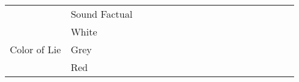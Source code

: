\begin{table*}[!h]
{\begin{tabular}{l|l|l|l|l|l|l|l|l|l|l|l|l|l|l|l|l|l}
                                                        & Sound Factual           & \multicolumn{1}{l|}{} & \multicolumn{1}{l|}{}                  & \multicolumn{1}{l|}{} & \multicolumn{1}{l|}{}                  & \multicolumn{1}{l|}{} & \multicolumn{1}{l|}{}                  & \multicolumn{1}{l|}{} &                   & \multicolumn{1}{l|}{} & \multicolumn{1}{l|}{}                  & \multicolumn{1}{l|}{} & \multicolumn{1}{l|}{}                  & \multicolumn{1}{l|}{} & \multicolumn{1}{l|}{}                  & \multicolumn{1}{l|}{} &                   \\ \cline{1-18} 
                        \multirow{4}{*}{Color of Lie}   & White                   & \multicolumn{1}{l|}{} & \multicolumn{1}{l|}{\multirow{4}{*}{}} & \multicolumn{1}{l|}{} & \multicolumn{1}{l|}{\multirow{4}{*}{}} & \multicolumn{1}{l|}{} & \multicolumn{1}{l|}{\multirow{4}{*}{}} & \multicolumn{1}{l|}{} & \multirow{4}{*}{} & \multicolumn{1}{l|}{} & \multicolumn{1}{l|}{\multirow{4}{*}{}} & \multicolumn{1}{l|}{} & \multicolumn{1}{l|}{\multirow{4}{*}{}} & \multicolumn{1}{l|}{} & \multicolumn{1}{l|}{\multirow{4}{*}{}} & \multicolumn{1}{l|}{} & \multirow{4}{*}{} \\ \cline{2-3} \cline{5-5} \cline{7-7} \cline{9-9} \cline{11-11} \cline{13-13} \cline{15-15} \cline{17-17}
                                                        & Grey                    & \multicolumn{1}{l|}{} & \multicolumn{1}{l|}{}                  & \multicolumn{1}{l|}{} & \multicolumn{1}{l|}{}                  & \multicolumn{1}{l|}{} & \multicolumn{1}{l|}{}                  & \multicolumn{1}{l|}{} &                   & \multicolumn{1}{l|}{} & \multicolumn{1}{l|}{}                  & \multicolumn{1}{l|}{} & \multicolumn{1}{l|}{}                  & \multicolumn{1}{l|}{} & \multicolumn{1}{l|}{}                  & \multicolumn{1}{l|}{} &                   \\ \cline{2-3} \cline{5-5} \cline{7-7} \cline{9-9} \cline{11-11} \cline{13-13} \cline{15-15} \cline{17-17}
                                                        & Red                     & \multicolumn{1}{l|}{} & \multicolumn{1}{l|}{}                  & \multicolumn{1}{l|}{} & \multicolumn{1}{l|}{}                  & \multicolumn{1}{l|}{} & \multicolumn{1}{l|}{}                  & \multicolumn{1}{l|}{} &                   & \multicolumn{1}{l|}{} & \multicolumn{1}{l|}{}                  & \multicolumn{1}{l|}{} & \multicolumn{1}{l|}{}                  & \multicolumn{1}{l|}{} & \multicolumn{1}{l|}{}                  & \multicolumn{1}{l|}{} &                   \\ \cline{2-3} \cline{5-5} \cline{7-7} \cline{9-9} \cline{11-11} \cline{13-13} \cline{15-15} \cline{17-17}

\end{tabular}}
\end{table*}
